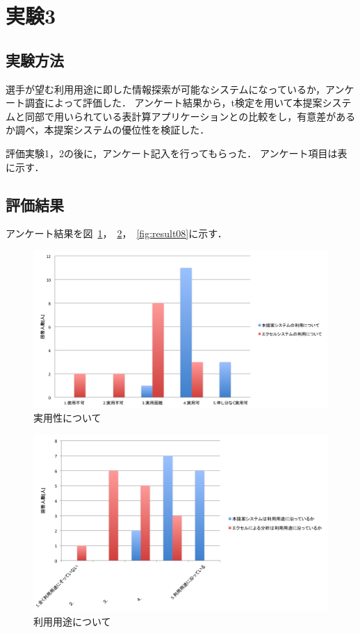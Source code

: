 \documentclass[sotsuron]{kuee}
\begin{document}
	\section{実験3}
		\subsection{実験方法}
			選手が望む利用用途に即した情報探索が可能なシステムになっているか，アンケート調査によって評価した．
			アンケート結果から，t検定を用いて本提案システムと同部で用いられている表計算アプリケーションとの比較をし，有意差があるか調べ，本提案システムの優位性を検証した．
			
			評価実験1，2の後に，アンケート記入を行ってもらった．
			アンケート項目は表に示す．
		\subsection{評価結果}
		アンケート結果を図~\ref{fig:result06}，~\ref{fig:result07}，~\ref{fig:result08}に示す．
			\begin{figure}
				\begin{center}
					\includegraphics[width=\linewidth]{./png/result06.png}
				\end{center}
				\caption{実用性について}
		  		\label{fig:result06}
			\end{figure}
			\begin{figure}
				\begin{center}
					\includegraphics[width=\linewidth]{./png/result07.png}
				\end{center}
				\caption{利用用途について}
		  		\label{fig:result07}
			\end{figure}
\end{document}
